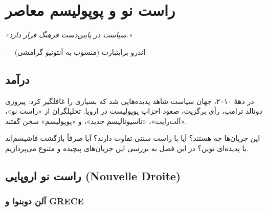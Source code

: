 
\chapter{راست نو و پوپولیسم معاصر}

\begin{tcolorbox}[
    enhanced,
    colback=VeryLightGray, %
    colframe=RightBlue, %
    boxrule=2pt,
    arc=8pt,
    fonttitle=\bfseries\large,
    title={\rl{نقل‌قول آغازین}},
    attach boxed title to top center={yshift=-3mm},
    boxed title style={colback=RightBlue, colframe=RightBlue} %
]
\begin{center}
\Large\textit{«سیاست در پایین‌دست فرهنگ قرار دارد.»}

\vspace{3mm}
\normalsize
--- اندرو برایتبارت (منسوب به آنتونیو گرامشی)
\end{center}
\end{tcolorbox}

\vspace{5mm}

\section*{درآمد}


در دههٔ ۲۰۱۰، جهان سیاست شاهد پدیده‌هایی شد که بسیاری را غافلگیر کرد: پیروزی دونالد ترامپ، رأی برگزیت، صعود احزاب پوپولیست در اروپا. تحلیلگران از «راست نو»، «آلت‌رایت»، «ناسیونالیسم جدید»، و «پوپولیسم» سخن گفتند.

این جریان‌ها چه هستند؟ آیا با راست سنتی تفاوت دارند؟ آیا صرفاً بازگشت فاشیسم‌اند یا پدیده‌ای نوین؟ در این فصل به بررسی این جریان‌های پیچیده و متنوع می‌پردازیم.


\section{راست نو اروپایی (Nouvelle Droite)}

\subsection{آلن دوبنوا و GRECE}

